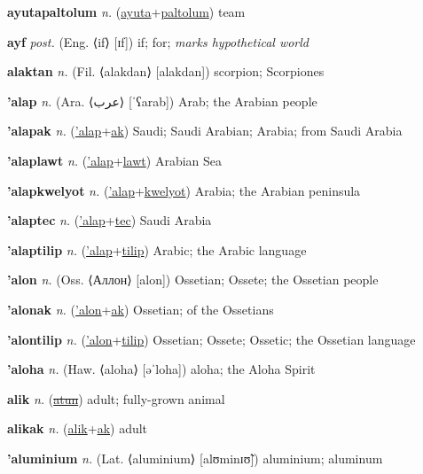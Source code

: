 \textbf{\hypertarget{ayutapaltolum}{ayutapaltolum}} \textit{n.} (\hyperlink{ayuta}{ayuta}+\allowbreak \hyperlink{paltolum}{paltolum})
team

\textbf{\hypertarget{ayf}{ayf}} \textit{post.} (Eng. ⟨if⟩ [ɪf])
if; for; \textit{marks hypothetical world}

\textbf{\hypertarget{alaktan}{alaktan}} \textit{n.} (Fil. ⟨alakdan⟩ [alakdan])
scorpion; Scorpiones

\textbf{\hypertarget{'alap}{'alap}} \textit{n.} (Ara. ⟨{\arabics{}عرب}⟩ [ˈʕarab])
Arab; the Arabian people

\textbf{\hypertarget{'alapak}{'alapak}} \textit{n.} (\hyperlink{'alap}{'alap}+\allowbreak \hyperlink{ak}{ak})
Saudi; Saudi Arabian; Arabia; from Saudi Arabia

\textbf{\hypertarget{'alaplawt}{'alaplawt}} \textit{n.} (\hyperlink{'alap}{'alap}+\allowbreak \hyperlink{lawt}{lawt})
Arabian Sea

\textbf{\hypertarget{'alapkwelyot}{'alapkwelyot}} \textit{n.} (\hyperlink{'alap}{'alap}+\allowbreak \hyperlink{kwelyot}{kwelyot})
Arabia; the Arabian peninsula

\textbf{\hypertarget{'alaptec}{'alaptec}} \textit{n.} (\hyperlink{'alap}{'alap}+\allowbreak \hyperlink{tec}{tec})
Saudi Arabia

\textbf{\hypertarget{'alaptilip}{'alaptilip}} \textit{n.} (\hyperlink{'alap}{'alap}+\allowbreak \hyperlink{tilip}{tilip})
Arabic; the Arabic language

\textbf{\hypertarget{'alon}{'alon}} \textit{n.} (Oss. ⟨Аллон⟩ [alon])
Ossetian; Ossete; the Ossetian people

\textbf{\hypertarget{'alonak}{'alonak}} \textit{n.} (\hyperlink{'alon}{'alon}+\allowbreak \hyperlink{ak}{ak})
Ossetian; of the Ossetians

\textbf{\hypertarget{'alontilip}{'alontilip}} \textit{n.} (\hyperlink{'alon}{'alon}+\allowbreak \hyperlink{tilip}{tilip})
Ossetian; Ossete; Ossetic; the Ossetian language

\textbf{\hypertarget{'aloha}{'aloha}} \textit{n.} (Haw. ⟨aloha⟩ [əˈloha])
aloha; the Aloha Spirit

\textbf{\hypertarget{alik}{alik}} \textit{n.} (\hyperlink{atun}{\sout{atun}})
adult; fully-grown animal

\textbf{\hypertarget{alikak}{alikak}} \textit{n.} (\hyperlink{alik}{alik}+\allowbreak \hyperlink{ak}{ak})
adult

\textbf{\hypertarget{'aluminium}{'aluminium}} \textit{n.} (Lat. ⟨aluminium⟩ [alʊminɪʊ̃])
aluminium; aluminum

